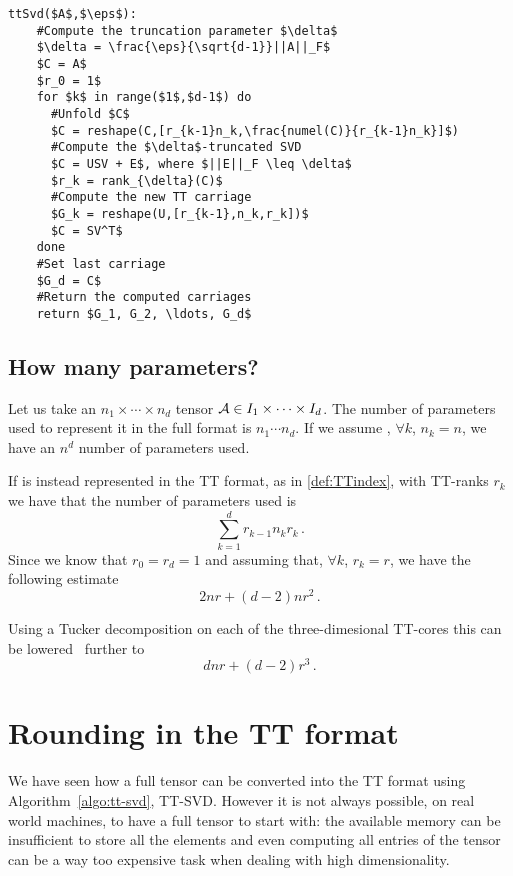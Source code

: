 \begin{lstlisting}[float, floatplacement=h, caption=TT-SVD compression algorithm, label=algo:tt-svd, title=TT-SVD compression algorithm]
  ttSvd($A$,$\eps$):
    #Compute the truncation parameter $\delta$
    $\delta = \frac{\eps}{\sqrt{d-1}}||A||_F$
    $C = A$
    $r_0 = 1$
    for $k$ in range($1$,$d-1$) do
      #Unfold $C$
      $C = reshape(C,[r_{k-1}n_k,\frac{numel(C)}{r_{k-1}n_k}]$)
      #Compute the $\delta$-truncated SVD
      $C = USV + E$, where $||E||_F \leq \delta$
      $r_k = rank_{\delta}(C)$
      #Compute the new TT carriage
      $G_k = reshape(U,[r_{k-1},n_k,r_k])$
      $C = SV^T$
    done
    #Set last carriage
    $G_d = C$
    #Return the computed carriages
    return $G_1, G_2, \ldots, G_d$
\end{lstlisting}

\subsection{How many parameters?}
Let us take an $n_1 \times \cdots \times n_d$ tensor $\mathcal{A} \in I_1 \times \cdots \times I_d$. The number of parameters used to represent it in the full format is $n_1 \cdots n_d$. If we assume , $\forall k$, $n_k  = n$, we have an $n^d$ number of parameters used.

If \A is instead represented in the TT format, as in \eqref{def:TTindex}, with TT-ranks $r_k$ we have that the number of parameters used is
\begin{equation*}
  \sum_{k=1}^d r_{k-1} n_k r_k\, .
\end{equation*}
Since we know that $r_0 = r_d = 1$ and assuming that, $\forall k$, $r_k = r$, we have the following estimate
\begin{equation*}
  2nr + (d-2)nr^2\, .
\end{equation*}

Using a Tucker decomposition on each of the three-dimesional TT-cores this can be lowered~\cite{oseledets2011tt} further to
\begin{equation*}
  dnr + (d-2)r^3\, .
\end{equation*}

\section{Rounding in the TT format}
We have seen how a full tensor can be converted into the TT format using Algorithm~\ref{algo:tt-svd}, TT-SVD. However it is not always possible, on real world machines, to have a full tensor to start with: the available memory can be insufficient to store all the elements and even computing all entries of the tensor can be a way too expensive task when dealing with high dimensionality.

